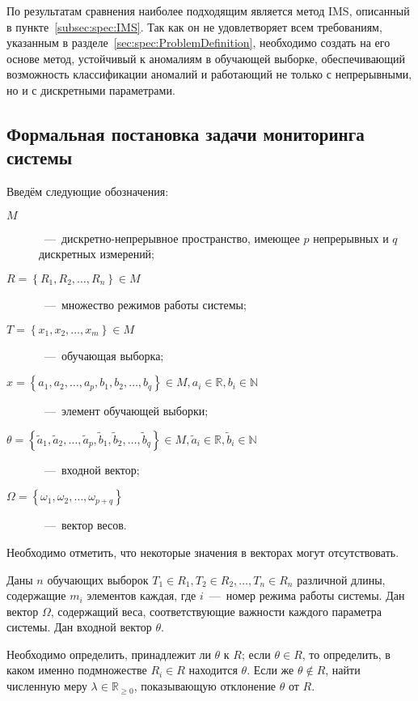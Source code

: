 По результатам сравнения наиболее подходящим является метод IMS, описанный в пункте~\ref{subsec:spec:IMS}. Так как он не удовлетворяет всем требованиям, указанным в разделе~\ref{sec:spec:ProblemDefinition}, необходимо создать на его основе метод, устойчивый к аномалиям в обучающей выборке, обеспечивающий возможность классификации аномалий и работающий не только с непрерывными, но и с дискретными параметрами.

\subsection{Формальная постановка задачи мониторинга системы}
\label{subsec:spec:DDMS:FormalTask}
Введём следующие обозначения:
\begin{description}
	\item[$M$]~---~дискретно-непрерывное пространство, имеющее $p$ непрерывных и $q$ дискретных измерений;
	\item[$R=\left\{R_1,R_2,\dots,R_n\right\} \in M$]~---~множество режимов работы системы;
	\item[$T=\left\{x_1,x_2,\dots,x_m\right\} \in M$]~---~обучающая выборка;
	\item[$x=\left\{a_1,a_2,\dots,a_p,b_1,b_2,\dots,b_q\right\} \in M, a_i\in\mathbb{R}, b_i\in\mathbb{N}$]~---~элемент обучающей выборки;
	\item[$\theta=\left\{\tilde{a}_1,\tilde{a}_2,\dots,\tilde{a}_p,\tilde{b}_1,\tilde{b}_2,\dots,\tilde{b}_q\right\} \in M, \tilde{a}_i\in\mathbb{R}, \tilde{b}_i\in\mathbb{N}$]~---~входной вектор;
	\item[$\Omega=\left\{\omega_1,\omega_2,\dots,\omega_{p+q}\right\}$]~---~вектор весов.
\end{description}

Необходимо отметить, что некоторые значения в векторах могут отсутствовать.

Даны $n$ обучающих выборок $T_1\in R_1, T_2\in R_2,\dots, T_n\in R_n$ различной длины, содержащие $m_i$ элементов каждая, где $i$~---~номер режима работы системы. Дан вектор $\Omega$, содержащий веса, соответствующие важности каждого параметра системы. Дан входной вектор $\theta$.

Необходимо определить, принадлежит ли $\theta$ к $R$; если $\theta \in R$, то определить, в каком именно подмножестве $R_i\in R$ находится $\theta$. Если же $\theta \notin R$, найти численную меру $\lambda \in \mathbb{R}_{\geq 0}$, показывающую отклонение $\theta$ от $R$.

